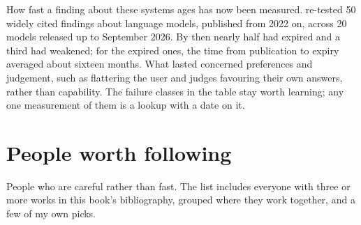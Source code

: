 How fast a finding about these systems ages has now been measured.
\textcite{queen2026shelflife} re-tested 50 widely cited findings about
language models, published from 2022 on, across 20 models released up to
September 2026. By then nearly half had expired and a third had weakened; for
the expired ones, the time from publication to expiry averaged about sixteen
months. What lasted concerned preferences and judgement, such as flattering
the user and judges favouring their own answers, rather than capability. The
failure classes in the table stay worth learning; any one measurement of them
is a lookup with a date on it.

\section{People worth following}

People who are careful rather than fast. The list includes everyone with three
or more works in this book's bibliography, grouped where they work together,
and a few of my own picks.

